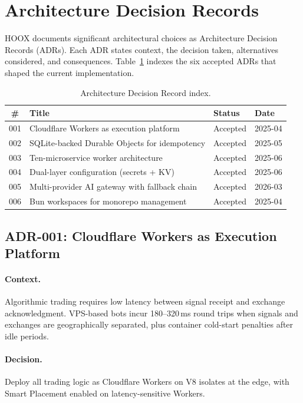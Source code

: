 \section{Architecture Decision Records}
\label{sec:adrs}

\textsc{HOOX} documents significant architectural choices as Architecture Decision Records (ADRs). Each ADR states context, the decision taken, alternatives considered, and consequences. Table~\ref{tab:adr-index} indexes the six accepted ADRs that shaped the current implementation.

\begin{table}[t]
  \centering
  \caption{Architecture Decision Record index.}
  \label{tab:adr-index}
  \small
  \begin{tabular*}{\linewidth}{@{\extracolsep{\fill}}clll@{}}
    \toprule
    \textbf{\#} & \textbf{Title} & \textbf{Status} & \textbf{Date} \\
    \midrule
    001 & Cloudflare Workers as execution platform & Accepted & 2025-04 \\
    002 & SQLite-backed Durable Objects for idempotency & Accepted & 2025-05 \\
    003 & Ten-microservice worker architecture & Accepted & 2025-06 \\
    004 & Dual-layer configuration (secrets + KV) & Accepted & 2025-06 \\
    005 & Multi-provider AI gateway with fallback chain & Accepted & 2026-03 \\
    006 & Bun workspaces for monorepo management & Accepted & 2025-04 \\
    \bottomrule
  \end{tabular*}
\end{table}

\subsection{ADR-001: Cloudflare Workers as Execution Platform}

\paragraph{Context.} Algorithmic trading requires low latency between signal receipt and exchange acknowledgment. VPS-based bots incur 180--320\,ms round trips when signals and exchanges are geographically separated, plus container cold-start penalties after idle periods.

\paragraph{Decision.} Deploy all trading logic as Cloudflare Workers on V8 isolates at the edge, with Smart Placement enabled on latency-sensitive Workers.

